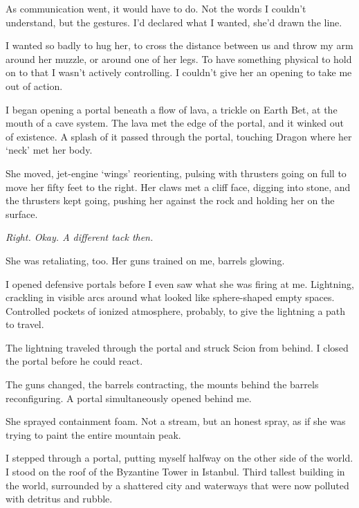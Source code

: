 As communication went, it would have to do.  Not the words I couldn't understand, but the gestures.  I'd declared what I wanted, she'd drawn the line.



I wanted so badly to hug her, to cross the distance between us and throw my arm around her muzzle, or around one of her legs.  To have something physical to hold on to that I wasn't actively controlling.  I couldn't give her an opening to take me out of action.



I began opening a portal beneath a flow of lava, a trickle on Earth Bet, at the mouth of a cave system.  The lava met the edge of the portal, and it winked out of existence.  A splash of it passed through the portal, touching Dragon where her `neck' met her body.



She moved, jet-engine `wings' reorienting, pulsing with thrusters going on full to move her fifty feet to the right.  Her claws met a cliff face, digging into stone, and the thrusters kept going, pushing her against the rock and holding her on the surface.



\emph{Right.  Okay.  A different tack then.}



She was retaliating, too.  Her guns trained on me, barrels glowing.



I opened defensive portals before I even saw what she was firing at me.  Lightning, crackling in visible arcs around what looked like sphere-shaped empty spaces.  Controlled pockets of ionized atmosphere, probably, to give the lightning a path to travel.



The lightning traveled through the portal and struck Scion from behind.  I closed the portal before he could react.



The guns changed, the barrels contracting, the mounts behind the barrels reconfiguring.  A portal simultaneously opened behind me.



She sprayed containment foam.  Not a stream, but an honest spray, as if she was trying to paint the entire mountain peak.



I stepped through a portal, putting myself halfway on the other side of the world.  I stood on the roof of the Byzantine Tower in Istanbul.  Third tallest building in the world, surrounded by a shattered city and waterways that were now polluted with detritus and rubble.



